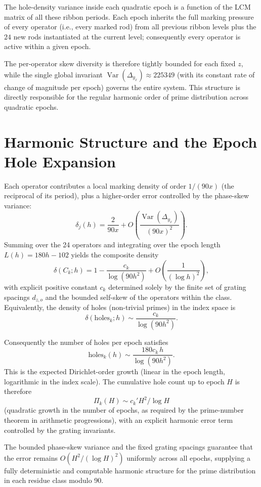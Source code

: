 \documentclass[11pt,a4paper]{article}
\begin{document}
The hole-density variance inside each quadratic epoch is a function of the LCM matrix of all these ribbon periods. Each epoch inherits the full marking pressure of every operator (i.e., every marked rod) from all previous ribbon levels plus the $24$ new rods instantiated at the current level; consequently every operator is active within a given epoch.

The per-operator skew diversity is therefore tightly bounded for each fixed \(z\), while the single global invariant \(\operatorname{Var}(\Delta_{y_x})\approx225349\) (with its constant rate of change of magnitude per epoch) governs the entire system. This structure is directly responsible for the regular harmonic order of prime distribution across quadratic epochs.


\section{Harmonic Structure and the Epoch Hole Expansion}

Each operator contributes a local marking density of order \(1/(90x)\) (the reciprocal of its period), plus a higher-order error controlled by the phase-skew variance:
\[
\delta_j(h)=\frac{2}{90x}+O\left(\frac{\operatorname{Var}(\Delta_{y_x})}{(90x)^2}\right).
\]
Summing over the 24 operators and integrating over the epoch length \(L(h)=180h-102\) yields the composite density
\[
\delta(C_k;h)=1-\frac{c_k}{\log(90h^2)}+O\left(\frac{1}{(\log h)^2}\right),
\]
with explicit positive constant \(c_k\) determined solely by the finite set of grating spacings \(d_{z,o}\) and the bounded self-skew of the operators within the class. Equivalently, the density of holes (non-trivial primes) in the index space is
\[
\delta(\text{holes}_k;h)\sim\frac{c_k}{\log(90h^2)}.
\]

Consequently the number of holes per epoch satisfies
\[
\text{holes}_k(h)\sim\frac{180c_k\,h}{\log(90h^2)}.
\]
This is the expected Dirichlet-order growth (linear in the epoch length, logarithmic in the index scale). The cumulative hole count up to epoch \(H\) is therefore
\[
\Pi_k(H)\sim c_k'H^2/\log H
\]
(quadratic growth in the number of epochs, as required by the prime-number theorem in arithmetic progressions), with an explicit harmonic error term controlled by the grating invariants.

The bounded phase-skew variance and the fixed grating spacings guarantee that the error remains \(O(H^2/(\log H)^2)\) uniformly across all epochs, supplying a fully deterministic and computable harmonic structure for the prime distribution in each residue class modulo 90.
\end{document}
